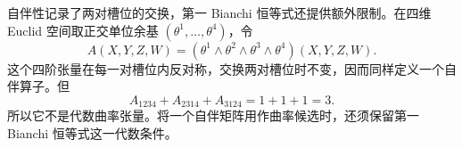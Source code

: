 \begin{example}\label{g3:exm:self-adjoint-without-bianchi}
	自伴性记录了两对槽位的交换，第一 Bianchi 恒等式还提供额外限制。在四维 Euclid 空间取正交单位余基 \((\theta^1,\ldots,\theta^4)\)，令
	\[
		A(X,Y,Z,W)=(\theta^1\wedge\theta^2\wedge\theta^3\wedge\theta^4)(X,Y,Z,W).
	\]
	这个四阶张量在每一对槽位内反对称，交换两对槽位时不变，因而同样定义一个自伴算子。但
	\[
		A_{1234}+A_{2314}+A_{3124}=1+1+1=3.
	\]
	所以它不是代数曲率张量。将一个自伴矩阵用作曲率候选时，还须保留第一 Bianchi 恒等式这一代数条件。
\end{example}
